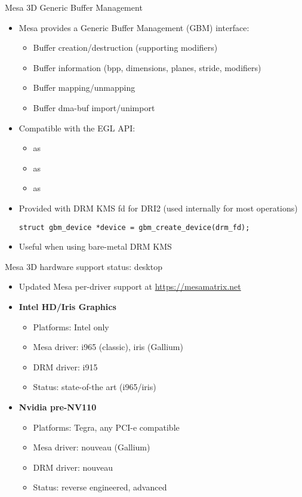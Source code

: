 \begin{frame}[fragile]{Mesa 3D Generic Buffer Management}
  \begin{itemize}
  \item Mesa provides a Generic Buffer Management (GBM) interface:
    \begin{itemize}
    \item Buffer creation/destruction (supporting modifiers)
    \item Buffer information (bpp, dimensions, planes, stride, modifiers)
    \item Buffer mapping/unmapping
    \item Buffer dma-buf import/unimport
    \end{itemize}
  \item Compatible with the EGL API:
    \begin{itemize}
    \item {} as 
    \item {} as 
    \item {} as 
    \end{itemize}
  \item Provided with DRM KMS fd for DRI2 (used internally for most operations)\\
  \begin{verbatim}
struct gbm_device *device = gbm_create_device(drm_fd);
  \end{verbatim}
  \item Useful when using bare-metal DRM KMS
  \end{itemize}
\end{frame}

\begin{frame}{Mesa 3D hardware support status: desktop}
  \begin{itemize}
  \item Updated Mesa per-driver support at \url{https://mesamatrix.net}
  \item \textbf{Intel HD/Iris Graphics}
    \begin{itemize}
    \item Platforms: Intel only
    \item Mesa driver: i965 (classic), iris (Gallium)
    \item DRM driver: i915
    \item Status: state-of-the art (i965/iris)
    \end{itemize}
  \item \textbf{Nvidia pre-NV110}
    \begin{itemize}
    \item Platforms: Tegra, any PCI-e compatible
    \item Mesa driver: nouveau (Gallium)
    \item DRM driver: nouveau
    \item Status: reverse engineered, advanced
    \end{itemize}
  \end{itemize}
\end{frame}


